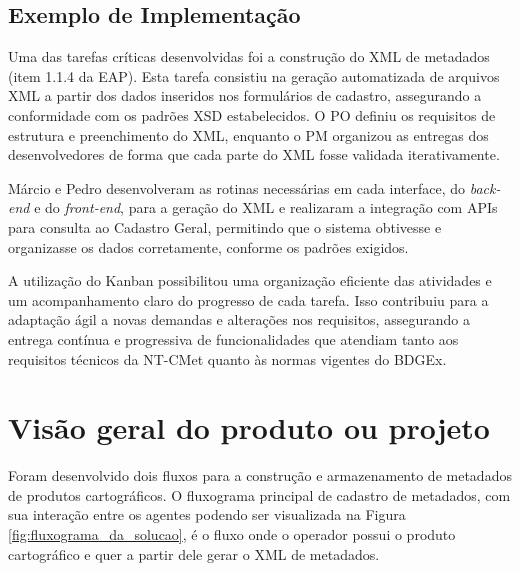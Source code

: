 \subsection{Exemplo de Implementação}

Uma das tarefas críticas desenvolvidas foi a construção do XML de metadados (item 1.1.4 da EAP). Esta tarefa consistiu na geração automatizada de arquivos XML a partir dos dados inseridos nos formulários de cadastro, assegurando a conformidade com os padrões XSD estabelecidos. O PO definiu os requisitos de estrutura e preenchimento do XML, enquanto o PM organizou as entregas dos desenvolvedores de forma que cada parte do XML fosse validada iterativamente.

Márcio e Pedro desenvolveram as rotinas necessárias em cada interface, do \textit{back-end} e do \textit{front-end}, para a geração do XML e realizaram a integração com APIs para consulta ao Cadastro Geral, permitindo que o sistema obtivesse e organizasse os dados corretamente, conforme os padrões exigidos.

A utilização do Kanban possibilitou uma organização eficiente das atividades e um acompanhamento claro do progresso de cada tarefa. Isso contribuiu para a adaptação ágil a novas demandas e alterações nos requisitos, assegurando a entrega contínua e progressiva de funcionalidades que atendiam tanto aos requisitos técnicos da NT-CMet quanto às normas vigentes do BDGEx.

\section{Visão geral do produto ou projeto}

Foram desenvolvido dois fluxos para a construção e armazenamento de metadados de produtos cartográficos.
O fluxograma principal de cadastro de metadados, com sua interação entre os agentes podendo ser visualizada na Figura \ref{fig:fluxograma_da_solucao}, é o fluxo onde o operador possui o produto cartográfico e quer a partir dele gerar o XML de metadados.

